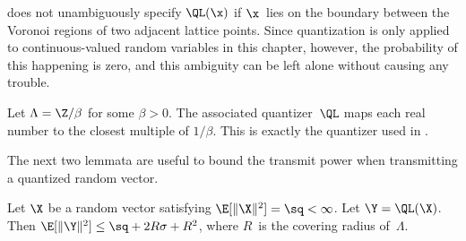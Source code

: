 \begin{subappendices}
  \begin{remark}
    \label{rem:latticequant}
     does not unambiguously specify $\QL(\x)$ if $\x$~lies
    on the boundary between the Voronoi regions of two adjacent lattice points.
    Since quantization is only applied to continuous-valued random variables in
    this chapter, however, the probability of this happening is zero, and this
    ambiguity can be left alone without causing any trouble.
  \end{remark}

  \begin{example}
    Let $\Lambda = \Z / \beta$ for some $\beta >0$. The associated
    quantizer~$\QL$ maps each real number to the closest multiple of $1/\beta$.
    This is exactly the quantizer used in .
  \end{example}

  The next two lemmata are useful to bound the transmit power when transmitting
  a quantized random vector.
  \begin{lemma}
    \label{lem:latquantvar}
    Let $\X$ be a random vector satisfying $\E[\|\X\|^2]
    = \sq < \infty$. Let $\Y = \QL(\X)$. Then $\E[\|\Y\|^2] \le \sq + 2R\sigma +
    R^2$, where $R$~is the covering radius of~$\Lambda$.
  \end{lemma}


\end{subappendices}
